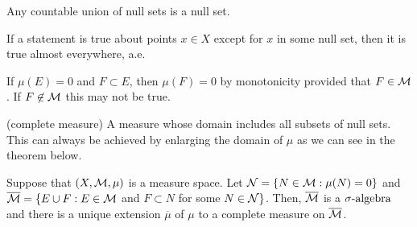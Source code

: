 \begin{rmk}
	Any countable union of null sets is a null set.
\end{rmk}

\begin{dfn} If a statement is true about points $x \in X$ except for $x$ in some null set, then it is true almost everywhere, a.e.
\end{dfn}

\begin{rmk}
	If $\mu(E)=0$ and $F \subset E$, then $\mu(F)=0$ by monotonicity provided that $F \in {\mathcal M}$. If $F \not\in {\mathcal M}$ this may not be true.
\end{rmk}
\begin{dfn}(complete measure)
	A measure whose domain includes all subsets of null sets. This can always be achieved by enlarging the domain of $\mu$ as we can see in the theorem below.
\end{dfn}
\begin{thm}
	Suppose that $(X, {\mathcal M}, \mu)$ is a measure space. Let ${\mathcal N}=\{N \in {\mathcal M} : \mu(N)=0\}$ and $\overline{{\mathcal M}}=\{E \cup F : E \in {\mathcal M} $ and $ F \subset N$ for some $N \in {\mathcal N}\}$. Then, $\overline{{\mathcal M}}$ is a ${\sigma}\text{-algebra}$ and there is a unique extension $\overline{\mu}$ of $\mu$ to a complete measure on $\overline{{\mathcal M}}$.
\end{thm}




